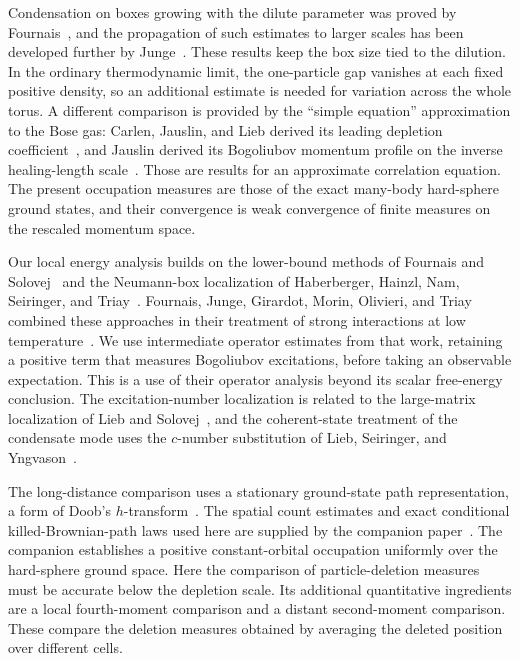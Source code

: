 Condensation on boxes growing with the dilute parameter was proved by
Fournais~\cite{Fournais2021}, and the propagation of such estimates
to larger scales has been developed further by Junge~\cite{Junge2026}.
These results keep the box size tied to the dilution. In the ordinary
thermodynamic limit, the one-particle gap vanishes at each fixed
positive density, so an additional estimate is needed for variation
across the whole torus. A different comparison is provided by the
``simple equation'' approximation to the Bose gas: Carlen, Jauslin,
and Lieb derived its leading depletion coefficient~\cite[Theorem~1.6]{CJL},
and Jauslin derived its Bogoliubov momentum profile on the inverse
healing-length scale~\cite[Theorem~3]{Jauslin2024}.
Those are results for an approximate correlation equation. The present
occupation measures are those of the exact many-body hard-sphere
ground states, and their convergence is weak convergence of finite
measures on the rescaled momentum space.

Our local energy analysis builds on the lower-bound methods of
Fournais and Solovej~\cite{FS2020,FS2023} and the Neumann-box
localization of Haberberger, Hainzl, Nam, Seiringer, and
Triay~\cite{HHNST}. Fournais, Junge, Girardot, Morin, Olivieri, and
Triay combined these approaches in their treatment of strong
interactions at low temperature~\cite{FJGMOT}. We use intermediate
operator estimates from that work, retaining a positive term that
measures Bogoliubov excitations, before taking an observable expectation.
This is a use of their operator analysis beyond its scalar free-energy
conclusion. The excitation-number localization is related to the
large-matrix localization of Lieb and Solovej~\cite[Appendix~A]{LS2001},
and the coherent-state treatment of the condensate mode uses the
$c$-number substitution of Lieb, Seiringer, and Yngvason~\cite{LSY2005}.

The long-distance comparison uses a stationary ground-state path
representation, a form of Doob's $h$-transform~\cite{Doob}. The spatial
count estimates and exact conditional killed-Brownian-path laws used
here are supplied by the companion paper~\cite{H}. The companion
establishes a positive constant-orbital occupation uniformly over the
hard-sphere ground space. Here the comparison of particle-deletion
measures must be accurate below the depletion scale. Its additional
quantitative ingredients are a local fourth-moment comparison and a
distant second-moment comparison. These compare the deletion measures
obtained by averaging the deleted position over different cells.

